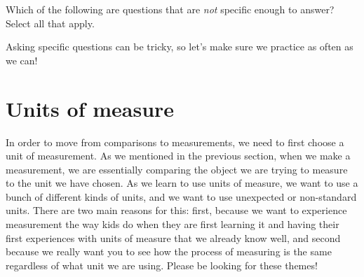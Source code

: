 \documentclass{ximera}
\begin{document}
\begin{question}
Which of the following are questions that are \emph{not} specific enough to answer? Select all that apply.
\begin{selectAll}
\end{selectAll}
\end{question}

Asking specific questions can be tricky, so let's make sure we practice as often as we can!


\section{Units of measure}

In order to move from comparisons to measurements, we need to first choose a unit of measurement. As we mentioned in the previous section, when we make a measurement, we are essentially comparing the object we are trying to measure to the unit we have chosen. As we learn to use units of measure, we want to use a bunch of different kinds of units, and we want to use unexpected or non-standard units. There are two main reasons for this: first, because we want to experience measurement the way kids do when they are first learning it and having their first experiences with units of measure that we already know well, and second because we really want you to see how the process of measuring is the same regardless of what unit we are using. Please be looking for these themes!
\end{document}
